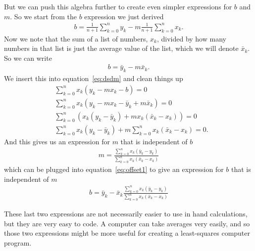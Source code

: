 But we can push this algebra further to create even simpler expressions for $b$ and $m$. So we start from the $b$ expression we just derived
\begin{align*}
b = \frac{1}{n+1}\sum_{k=0}^n y_k - m  \frac{1}{n+1}\sum_{k=0}^n x_k. 
\end{align*}
Now we note that the sum of a list of numbers, $x_k$, divided by how many numbers in that list is just the average value of the list, which we will denote $\bar{x}_k$. So we can write
\begin{align}
b = \bar{y}_k - m \bar{x}_k. \label{eq:offset1}
\end{align}
We insert this into equation~\ref{eq:dsdm} and clean things up
\begin{align*}
& \sum_{k=0}^n x_k\left(y_k - mx_k - b\right) = 0 \\
& \sum_{k=0}^n x_k\left(y_k - mx_k - \bar{y}_k + m \bar{x}_k\right) = 0 \\
& \sum_{k=0}^n \left( x_k \left(y_k - \bar{y}_k\right)   + m x_k\left(\bar{x}_k  - x_k\right) \right) = 0 \\
& \sum_{k=0}^n  x_k \left(y_k - \bar{y}_k\right)   + m \sum_{k=0}^n  x_k\left(\bar{x}_k  - x_k\right)  = 0.
\end{align*}
And this gives us an expression for $m$ that is independent of $b$
\begin{align*}
\boxed{  m   = \frac{\sum_{k=0}^n  x_k\left(\bar{y}_k - y_k\right)}{\sum_{k=0}^n  x_k \left(\bar{x}_k  - x_k \right) } }
\end{align*}
which can be plugged into equation~\ref{eq:offset1} to give an expression for $b$ that is independent of $m$
\begin{align*}
\boxed{b = \bar{y}_k - \bar{x}_k \frac{\sum_{k=0}^n  x_k\left(\bar{y}_k - y_k\right)}{\sum_{k=0}^n  x_k \left(\bar{x}_k  - x_k \right) } }
\end{align*}

These last two expressions are not necessarily easier to use in hand calculations, but they are very easy to code. A computer can take averages very easily, and so those two expressions might be more useful for creating a least-squares computer program.

